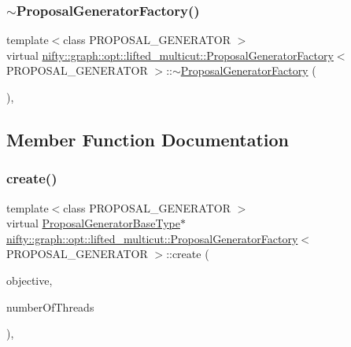 \subsubsection{\texorpdfstring{$\sim$\+Proposal\+Generator\+Factory()}{~ProposalGeneratorFactory()}}
{\footnotesize\ttfamily template$<$class P\+R\+O\+P\+O\+S\+A\+L\+\_\+\+G\+E\+N\+E\+R\+A\+T\+OR $>$ \\
virtual \hyperlink{classnifty_1_1graph_1_1opt_1_1lifted__multicut_1_1ProposalGeneratorFactory}{nifty\+::graph\+::opt\+::lifted\+\_\+multicut\+::\+Proposal\+Generator\+Factory}$<$ P\+R\+O\+P\+O\+S\+A\+L\+\_\+\+G\+E\+N\+E\+R\+A\+T\+OR $>$\+::$\sim$\hyperlink{classnifty_1_1graph_1_1opt_1_1lifted__multicut_1_1ProposalGeneratorFactory}{Proposal\+Generator\+Factory} (\begin{DoxyParamCaption}{ }\end{DoxyParamCaption})\hspace{0.3cm}{\ttfamily [inline]}, {\ttfamily [virtual]}}



\subsection{Member Function Documentation}
\mbox{\label{classnifty_1_1graph_1_1opt_1_1lifted__multicut_1_1ProposalGeneratorFactory_a9fd48d8b0b3fead665bb20fe960914b6}} 
\subsubsection{\texorpdfstring{create()}{create()}}
{\footnotesize\ttfamily template$<$class P\+R\+O\+P\+O\+S\+A\+L\+\_\+\+G\+E\+N\+E\+R\+A\+T\+OR $>$ \\
virtual \hyperlink{classnifty_1_1graph_1_1opt_1_1lifted__multicut_1_1ProposalGeneratorFactory_adbef9a4dba21ef9517233d4e74b4933f}{Proposal\+Generator\+Base\+Type}$\ast$ \hyperlink{classnifty_1_1graph_1_1opt_1_1lifted__multicut_1_1ProposalGeneratorFactory}{nifty\+::graph\+::opt\+::lifted\+\_\+multicut\+::\+Proposal\+Generator\+Factory}$<$ P\+R\+O\+P\+O\+S\+A\+L\+\_\+\+G\+E\+N\+E\+R\+A\+T\+OR $>$\+::create (\begin{DoxyParamCaption}\item[{const \hyperlink{classnifty_1_1graph_1_1opt_1_1lifted__multicut_1_1ProposalGeneratorFactory_ae173dfe15e6d1706c8a390c60024cc42}{Objective\+Type} \&}]{objective,  }\item[{const size\+\_\+t}]{number\+Of\+Threads }\end{DoxyParamCaption})\hspace{0.3cm}{\ttfamily [inline]}, {\ttfamily [virtual]}}

